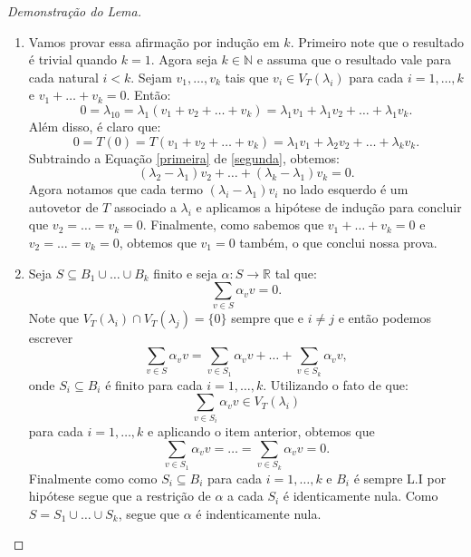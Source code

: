 \documentclass[11pt,twoside,a4paper]{book}
\begin{document}
\begin{proof}[Demonstração do Lema]\hfill
\begin{enumerate}
\item Vamos provar essa afirmação por indução em \(k\). Primeiro note que o
resultado é trivial quando \(k=1\). Agora seja \(k\in\mathbb{N}\) e
assuma  que o resultado vale para cada natural \(i < k\). Sejam
\(v_1,\ldots,v_k\) tais que \(v_i\in V_T(\lambda_i)\) para cada \(i=1,\dots,k\) 
e \(v_1+\ldots + v_k=0\). Então:
\begin{equation}\label{primeira}
0=\lambda_10=\lambda_1(v_1+v_2+\ldots+v_k)=\lambda_1v_1+\lambda_1v_2+\ldots+\lambda_1v_k.
\end{equation}
Além disso, é claro que:
\begin{equation}\label{segunda}
0=T(0)=T(v_1+v_2+\ldots+v_k)=\lambda_1v_1+\lambda_2v_2+\ldots+\lambda_kv_k.
\end{equation}
Subtraindo a Equação \ref{primeira} de \ref{segunda}, obtemos:
\begin{equation}\label{terceira}
(\lambda_2-\lambda_1)v_2+\ldots +(\lambda_k-\lambda_1)v_k=0.
\end{equation}
Agora notamos que cada termo $(\lambda_i-\lambda_1)v_i$ no lado esquerdo é um autovetor de \(T\) associado a $\lambda_i$ e 
aplicamos a hipótese de indução para concluir que \(v_2=\ldots =v_k=0\). 
Finalmente, como sabemos que \(v_1+\ldots +v_k=0\) e \(v_2=\ldots =
v_k=0\), obtemos que \(v_1=0\) também, o que conclui nossa prova.
\item Seja \(S\subseteq B_1\cup\dots\cup B_k\) finito e seja \(\alpha\colon S\to\mathbb{R}\) tal que:
\[
\sum_{v\in S}\alpha_vv=0.
\]
Note que
\(V_T(\lambda_i)\cap V_T(\lambda_j)=\{0\}\) sempre que e
\(i\not=j\) e então podemos escrever
\[\sum_{v\in S}\alpha_vv=\sum_{v\in S_1}\alpha_v v+\ldots+\sum_{v\in
S_k}\alpha_vv,\]
onde \(S_i\subseteq B_i\) é finito para cada \(i=1,\dots,k\). Utilizando o fato de que:
\[
\sum_{v\in S_i}\alpha_v v\in V_T(\lambda_i)
\]
para cada \(i=1,\dots,k\) e aplicando o item anterior, obtemos que
\[\sum_{v\in S_1}\alpha_vv=\ldots=\sum_{v\in S_k}\alpha_vv=0.\]
Finalmente como como \(S_i\subseteq B_i\) para cada \(i=1,\dots,k\) e
\(B_i\) é sempre L.I por hipótese segue que a restrição de \(\alpha\) a
cada \(S_i\) é identicamente nula. Como \(S=S_1\cup\dots\cup S_k\), segue
que \(\alpha\) é indenticamente nula. \qedhere
\end{enumerate}
\end{proof}
\end{document}
